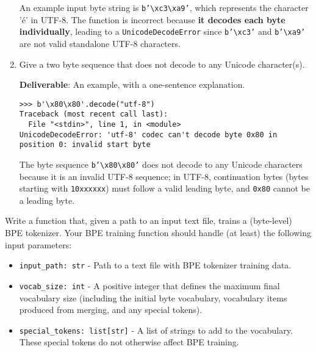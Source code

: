 \begin{enumerate}[label=(\alph*)]
    \begin{answer}
    An example input byte string is \texttt{b'\textbackslash xc3\textbackslash xa9'}, which represents the character 'é' in UTF-8. The function is incorrect because \textbf{it decodes each byte individually}, leading to a \texttt{UnicodeDecodeError} since \texttt{b'\textbackslash xc3'} and \texttt{b'\textbackslash xa9'} are not valid standalone UTF-8 characters.
    \end{answer}
    
    \item {Give a two byte sequence that does not decode to any Unicode character(s).}
    
    {\textbf{Deliverable}: An example, with a one-sentence explanation.}
    
    \begin{lstlisting}
>>> b'\x80\x80'.decode("utf-8") 
Traceback (most recent call last):
  File "<stdin>", line 1, in <module>
UnicodeDecodeError: 'utf-8' codec can't decode byte 0x80 in position 0: invalid start byte
    \end{lstlisting}

    \begin{answer}
    The byte sequence \texttt{b'\textbackslash x80\textbackslash x80'} does not decode to any Unicode characters because it is an invalid UTF-8 sequence; in UTF-8, continuation bytes (bytes starting with \texttt{10xxxxxx}) must follow a valid leading byte, and \texttt{0x80} cannot be a leading byte.
    \end{answer}
\end{enumerate}


Write a function that, given a path to an input text file, trains a (byte-level) BPE tokenizer. Your BPE training function should handle (at least) the following input parameters:

\begin{itemize}
    \item \lstinline{input_path: str} - Path to a text file with BPE tokenizer training data.
    \item \lstinline{vocab_size: int} - A positive integer that defines the maximum final vocabulary size (including the initial byte vocabulary, vocabulary items produced from merging, and any special tokens).
    \item \lstinline{special_tokens: list[str]} - A list of strings to add to the vocabulary. These special tokens do not otherwise affect BPE training.
\end{itemize}

